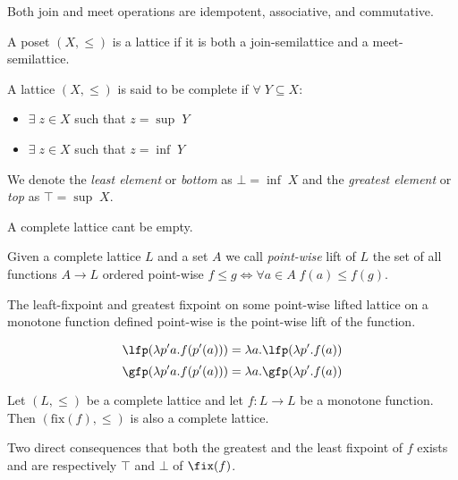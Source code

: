 \begin{observation}
  Both join and meet operations are idempotent, associative, and commutative.
\end{observation}

\begin{definition}[Lattice]
  A poset $(X, \leq)$ is a lattice if it is both a join-semilattice and a 
  meet-semilattice.
\end{definition}

\begin{definition}
  A lattice $(X, \leq)$ is said to be complete if $\forall \; Y \subseteq X$:
  \begin{itemize}
    \item $\exists \; z \in X$ such that $z = \sup \; Y$
    \item $\exists \; z \in X$ such that $z = \inf \; Y$
  \end{itemize}

  We denote the \textit{least element} or \textit{bottom} as $\bot = \inf \; X$ 
  and the \textit{greatest element} or \textit{top} as $\top = \sup \; X$.
\end{definition}

\begin{observation}
  A complete lattice cant be empty.
\end{observation}

\begin{definition}
  Given a complete lattice $L$ and a set $A$ we call \textit{point-wise} lift
  of $L$ the set of all functions $A \to L$ ordered point-wise $f \leq g \iff
  \forall a \in A \; f(a) \leq f(g)$.
\end{definition}

\begin{theorem}
  The leaft-fixpoint and greatest fixpoint on some point-wise lifted lattice on 
  a monotone function defined point-wise is the point-wise lift of the function.

  $$\lfp(\lambda p' a . f(p'(a))) = \lambda a . \lfp(\lambda p' . f(a))$$
  $$\gfp(\lambda p' a . f(p'(a))) = \lambda a . \gfp(\lambda p' . f(a))$$
\end{theorem}

\begin{theorem}
  \label{thm:knaster}
  Let $(L, \leq)$ be a complete lattice and let $f : L \to L$ be a monotone 
  function. Then $(\text{fix}(f), \leq)$ is also a complete lattice.
\end{theorem}

Two direct consequences that both the greatest and the least fixpoint of
$f$ exists and are respectively $\top$ and $\bot$ of $\fix(f)$.

